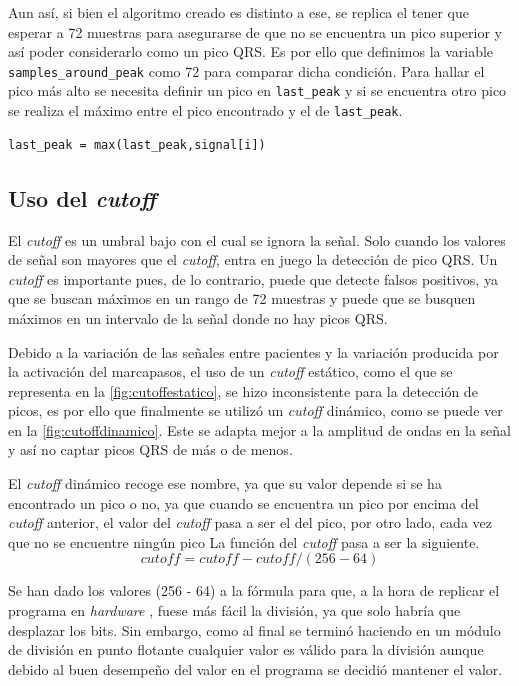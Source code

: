 Aun así, si bien el algoritmo creado es distinto a ese, se replica el tener que esperar a 72 muestras para asegurarse de que no se encuentra un pico superior y así poder considerarlo como un pico QRS. Es por ello que definimos la variable \texttt{samples\_around\_peak} como 72 para comparar dicha condición. Para hallar el pico más alto se necesita definir un pico en \texttt{last\_peak} y si se encuentra otro pico se realiza el máximo entre el pico encontrado y el de \texttt{last\_peak}.

\lstset{language=python, breaklines=true, basicstyle=\footnotesize}
\begin{lstlisting}[frame=single]
last_peak = max(last_peak,signal[i])
\end{lstlisting}
\subsection{Uso del \textit{cutoff}}
El \textit{cutoff} es un umbral bajo con el cual se ignora la señal. Solo cuando los valores de señal son mayores que el \textit{cutoff}, entra en juego la detección de pico QRS. Un \textit{cutoff} es importante pues, de lo contrario, puede que detecte falsos positivos, ya que se buscan máximos en un rango de 72 muestras y puede que se busquen máximos en un intervalo de la señal donde no hay picos QRS.

Debido a la variación de las señales entre pacientes y la variación producida por la activación del marcapasos, el uso de un \textit{cutoff} estático, como el que se representa en la \cref{fig:cutoffestatico}, se hizo inconsistente para la detección de picos, es por ello que finalmente se utilizó un \textit{cutoff} dinámico, como se puede ver en la \cref{fig:cutoffdinamico}. Este se adapta mejor a la amplitud de ondas en la señal y así no captar picos QRS de más o de menos.

El \textit{cutoff} dinámico recoge ese nombre, ya que su valor depende si se ha encontrado un pico o no, ya que cuando se encuentra un pico por encima del \textit{cutoff} anterior, el valor del \textit{cutoff} pasa a ser el del pico, por otro lado, cada vez que no se encuentre ningún pico La función del \textit{cutoff} pasa a ser la siguiente.
\[cutoff = cutoff - cutoff/(256 - 64)\]

Se han dado los valores (256 - 64) a la fórmula para que, a la hora de replicar el programa en  \textit{hardware} , fuese más fácil la división, ya que solo habría que desplazar los bits. Sin embargo, como al final se terminó haciendo en un módulo de división en punto flotante cualquier valor es válido para la división aunque debido al buen desempeño del valor en el programa se decidió mantener el valor.

